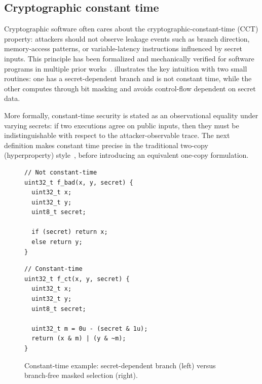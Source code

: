 \documentclass[fontset=fira-newtxsf]{mitthesis}
\theoremstyle{definition}
\theoremstyle{plain}
\begin{document}
\subsection{Cryptographic constant time} \label{sec:cct}
Cryptographic software often cares about the cryptographic-constant-time (CCT) property: attackers should not observe leakage events such as branch direction, memory-access patterns, or variable-latency instructions influenced by secret inputs.
This principle has been formalized and mechanically verified for software programs in multiple prior works~\cite{guarnieri2021,conoly2025,almeida2016}.
 illustrates the key intuition with two small routines: one has a secret-dependent branch and is not constant time, while the other computes through bit masking and avoids control-flow dependent on secret data.

More formally, constant-time security is stated as an observational equality under varying secrets: if two executions agree on public inputs, then they must be indistinguishable with respect to the attacker-observable trace.
The next definition makes constant time precise in the traditional two-copy (hyperproperty) style~\cite{clarkson2010}, before introducing an equivalent one-copy formulation.

\begin{figure}[H]
\begin{minipage}[t]{0.48\linewidth}
\begin{verbatim}
// Not constant-time
uint32_t f_bad(x, y, secret) {
  uint32_t x;
  uint32_t y;
  uint8_t secret;

  if (secret) return x;
  else return y;
}
\end{verbatim}
\end{minipage}\hfill
\begin{minipage}[t]{0.48\linewidth}
\begin{verbatim}
// Constant-time
uint32_t f_ct(x, y, secret) {
  uint32_t x;
  uint32_t y;
  uint8_t secret;

  uint32_t m = 0u - (secret & 1u);
  return (x & m) | (y & ~m);
}
\end{verbatim}
\end{minipage}
\caption[Constant-time example]{Constant-time example: secret-dependent branch (left) versus branch-free masked selection (right).}
\label{fig:cct-intuition}
\end{figure}
\end{document}
